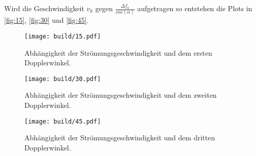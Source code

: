 Wird die Geschwindigkeit $v_k$ gegen $\frac{\Delta f_k}{cos(\alpha)}$ aufgetragen so entstehen die Plots in \autoref{fig:15}, \autoref{fig:30} und \autoref{fig:45}.
\begin{figure}[H]
    \texttt{[image: build/15.pdf]}
    \caption{Abhängigkeit der Strömungsgeschwindigkeit und dem ersten Dopplerwinkel.}
    \label{fig:15}
\end{figure}
\begin{figure}[H]
    \texttt{[image: build/30.pdf]}
    \caption{Abhängigkeit der Strömungsgeschwindigkeit und dem zweiten Dopplerwinkel.}
    \label{fig:30}
\end{figure}
\begin{figure}[H]
    \texttt{[image: build/45.pdf]}
    \caption{Abhängigkeit der Strömungsgeschwindigkeit und dem dritten Dopplerwinkel.}
    \label{fig:45}
\end{figure}


